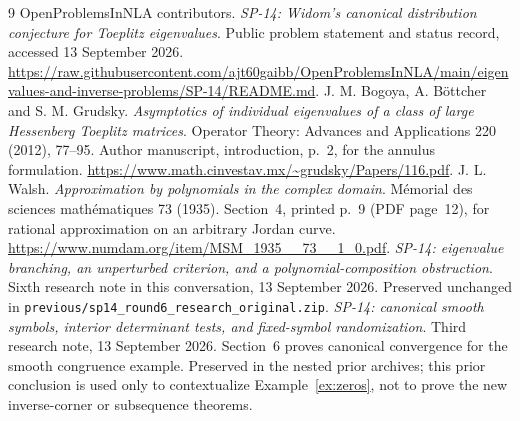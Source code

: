 \documentclass[11pt]{article}
\theoremstyle{definition}
\begin{document}
\begin{thebibliography}{9}
 OpenProblemsInNLA contributors. \emph{SP-14: Widom's canonical distribution conjecture for Toeplitz eigenvalues}. Public problem statement and status record, accessed 13 September 2026.
\url{https://raw.githubusercontent.com/ajt60gaibb/OpenProblemsInNLA/main/eigenvalues-and-inverse-problems/SP-14/README.md}.
 J. M. Bogoya, A. B\"ottcher and S. M. Grudsky. \emph{Asymptotics of individual eigenvalues of a class of large Hessenberg Toeplitz matrices}. Operator Theory: Advances and Applications 220 (2012), 77--95. Author manuscript, introduction, p.~2, for the annulus formulation.
\url{https://www.math.cinvestav.mx/~grudsky/Papers/116.pdf}.
 J. L. Walsh. \emph{Approximation by polynomials in the complex domain}. M\'emorial des sciences math\'ematiques 73 (1935). Section~4, printed p.~9 (PDF page~12), for rational approximation on an arbitrary Jordan curve.
\url{https://www.numdam.org/item/MSM_1935__73__1_0.pdf}.
 \emph{SP-14: eigenvalue branching, an unperturbed criterion, and a polynomial-composition obstruction}. Sixth research note in this conversation, 13 September 2026. Preserved unchanged in \texttt{previous/sp14\_round6\_research\_original.zip}.
 \emph{SP-14: canonical smooth symbols, interior determinant tests, and fixed-symbol randomization}. Third research note, 13 September 2026. Section~6 proves canonical convergence for the smooth congruence example. Preserved in the nested prior archives; this prior conclusion is used only to contextualize Example~\ref{ex:zeros}, not to prove the new inverse-corner or subsequence theorems.
\end{thebibliography}
\end{document}
